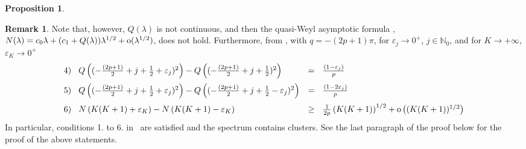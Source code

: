 \documentclass[11pt,a4paper,times]{amsart}
\theoremstyle{plain}
\newtheorem{proposition}{Proposition}[section]
\theoremstyle{definition}
\newtheorem{remark}{Remark}[section]
\numberwithin{equation}{section}
\newcommand{\ci}{c_{1}}
\newcommand{\eqskip}{ \vspace*{2mm}\\ }
\newcommand{\N}{\mathbb{N}}
\newcommand{\so}{{\rm o}}
\begin{document}
{\begin{proposition}
\begin{enumerate}[{\rm 1)}]
\end{enumerate}
  \end{proposition}
%
%
\begin{remark}\label{newC1}
  Note that, however,  $Q(\lambda)$ is not continuous, and then the quasi-Weyl asymptotic formula \cite[(1.7.5), p. 50]{sava}, $N(\lambda)=c_0\lambda+(\ci +Q(\lambda))\lambda^{1/2} +\so(\lambda^{1/2})$, does not hold.
 Furthermore,  from \cite[Corollary 1.7.9, p.\ 53, and (1.7.7), p.\ 50]{sava}, with $q=-(2p+1)\pi$, for
 $\varepsilon_j \to 0^+$, $j\in \N_0$, and for $K\to +\infty$, $\varepsilon_K\to 0^+$
\begin{gather*} \begin{array}{ll}
{\rm 4)}\hspace*{3mm} Q\left((-\frac{(2p+1)}{2}+j +\frac{1}{2} +\varepsilon_j)^2\right)- Q\left((-\frac{(2p+1)}{2}+j+ \frac{1}{2})^2\right) &=~~\frac{(1-\varepsilon_j)}{p}\eqskip
{\rm 5)}\hspace*{3mm} Q\left((-\frac{(2p+1)}{2}+j +\frac{1}{2}+\varepsilon_j)^2\right)- Q\left((-\frac{(2p+1)}{2}+j +\frac{1}{2} -\varepsilon_j)^2\right) &=~~\frac{(1-2\varepsilon_j)}{p}\eqskip
{\rm 6)}\hspace*{3mm}
N\left( K(K+1)+\varepsilon_K\right)-
 N\left( K(K+1)-\varepsilon_K\right) &\geq~~ \frac{1}{2p}
 \left(K(K+1)\right)^{1/2}
+\so\left( (K(K+1))^{1/2} \right)
\end{array}
\end{gather*}
%
In particular, conditions 1. to 6. in~\cite[p.\ 53]{sava} are satisfied and the spectrum contains clusters. See the last paragraph of the proof below for the proof
of the above statements.
\end{remark}

}
\end{document}
